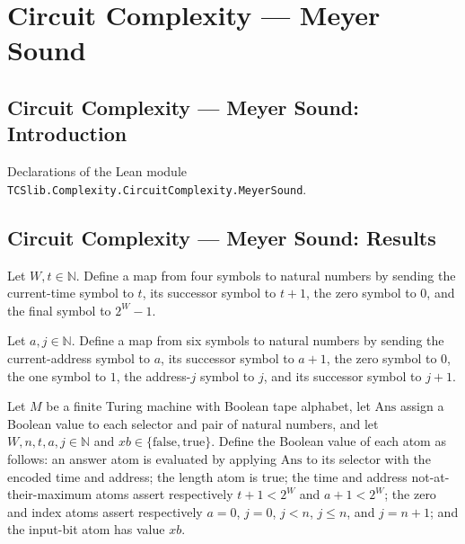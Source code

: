 \section{Circuit Complexity --- Meyer Sound}
\subsection*{Circuit Complexity --- Meyer Sound: Introduction}

Declarations of the Lean module \texttt{TCSlib.Complexity.CircuitComplexity.MeyerSound}.

\subsection*{Circuit Complexity --- Meyer Sound: Results}

\begin{definition}
\label{Complexity.Meyer.tvOf}
\leanok
{}
Let $W,t\in\mathbb{N}$. Define a map from four symbols to natural numbers by sending the
current-time symbol to $t$, its successor symbol to $t+1$, the zero symbol to $0$, and
the final symbol to $2^W-1$.
\end{definition}

\begin{definition}
\label{Complexity.Meyer.avOf}
\leanok
{}
Let $a,j\in\mathbb{N}$. Define a map from six symbols to natural numbers by sending the
current-address symbol to $a$, its successor symbol to $a+1$, the zero symbol to $0$,
the one symbol to $1$, the address-$j$ symbol to $j$, and its successor symbol to $j+1$.
\end{definition}

\begin{definition}
\label{Complexity.Meyer.NumVal}
\leanok
{}
Let $M$ be a finite Turing machine with Boolean tape alphabet, let $\mathrm{Ans}$ assign
a Boolean value to each selector and pair of natural numbers, and let
$W,n,t,a,j\in\mathbb{N}$ and $xb\in\{\mathrm{false},\mathrm{true}\}$. Define the Boolean
value of each atom as follows: an answer atom is evaluated by applying $\mathrm{Ans}$ to
its selector with the encoded time and address; the length atom is true; the time and
address not-at-their-maximum atoms assert respectively $t+1<2^W$ and $a+1<2^W$; the zero
and index atoms assert respectively $a=0$, $j=0$, $j<n$, $j\le n$, and $j=n+1$; and the
input-bit atom has value $xb$.
\end{definition}

